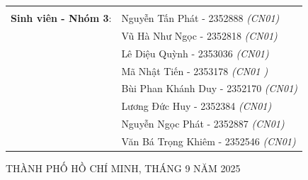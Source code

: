 \begin{titlepage}
\begin{table}[h]
\begin{tabular}{rl}
    & \\[5pt]
    \textbf{Sinh viên - Nhóm 3}: 
    &  Nguyễn Tấn Phát - 2352888 \emph{(CN01)} \\
    &  Vũ Hà Như Ngọc - 2352818 \emph{(CN01)}\\
    &  Lê Diệu Quỳnh - 2353036 \emph{(CN01)}\\
    &  Mã Nhật Tiến - 2353178 \emph{(CN01 )}\\
    &  Bùi Phan Khánh Duy - 2352170 \emph{(CN01)}\\   
    &  Lương Đức Huy - 2352384 \emph{(CN01)}\\   
    &  Nguyễn Ngọc Phát - 2352887 \emph{(CN01)}\\  
    &  Văn Bá Trọng Khiêm - 2352546 \emph{(CN01)}\\  
    

    \end{tabular}
\end{table}

\begin{center}
{\footnotesize THÀNH PHỐ HỒ CHÍ MINH, THÁNG 9 NĂM 2025}
\end{center}
\end{titlepage}
\pagebreak

